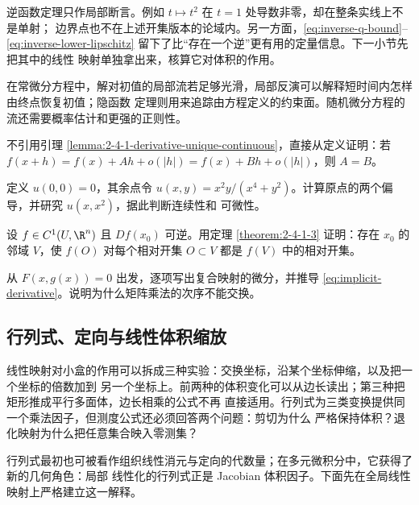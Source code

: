 逆函数定理只作局部断言。例如 $t\mapsto t^2$ 在 $t=1$ 处导数非零，却在整条实线上不是单射；
边界点也不在上述开集版本的论域内。另一方面，\eqref{eq:inverse-q-bound}--
\eqref{eq:inverse-lower-lipschitz} 留下了比“存在一个逆”更有用的定量信息。下一小节先把其中的线性
映射单独拿出来，核算它对体积的作用。

在常微分方程中，解对初值的局部流若足够光滑，局部反演可以解释短时间内怎样由终点恢复初值；隐函数
定理则用来追踪由方程定义的约束面。随机微分方程的流还需要概率估计和更强的正则性。

\begin{exercise}[微分的唯一性]\label{exercise:2-4-1-1}
不引用引理 \ref{lemma:2-4-1-derivative-unique-continuous}，直接从定义证明：若
$f(x+h)=f(x)+Ah+o(|h|)=f(x)+Bh+o(|h|)$，则 $A=B$。
\end{exercise}

\begin{exercise}[偏导仍然不够]\label{exercise:2-4-1-2}
定义 $u(0,0)=0$，其余点令 $u(x,y)=x^2y/(x^4+y^2)$。计算原点的两个偏导，并研究
$u(x,x^2)$，据此判断连续性和 \Frechet{} 可微性。
\end{exercise}

\begin{exercise}[局部开映射]\label{exercise:2-4-1-3}
设 $f\in C^1(U,\R^n)$ 且 $Df(x_0)$ 可逆。用定理 \ref{theorem:2-4-1-3} 证明：存在
$x_0$ 的邻域 $V$，使 $f(O)$ 对每个相对开集 $O\subset V$ 都是 $f(V)$ 中的相对开集。
\end{exercise}

\begin{exercise}[隐函数导数]\label{exercise:2-4-1-4}
从 $F(x,g(x))=0$ 出发，逐项写出复合映射的微分，并推导
\eqref{eq:implicit-derivative}。说明为什么矩阵乘法的次序不能交换。
\end{exercise}

\subsection{行列式、定向与线性体积缩放}\label{subsec:2-4-2}

线性映射对小盒的作用可以拆成三种实验：交换坐标，沿某个坐标伸缩，以及把一个坐标的倍数加到
另一个坐标上。前两种的体积变化可以从边长读出；第三种把矩形推成平行多面体，边长相乘的公式不再
直接适用。行列式为三类变换提供同一个乘法因子，但测度公式还必须回答两个问题：剪切为什么
严格保持体积？退化映射为什么把任意集合映入零测集？

行列式最初也可被看作组织线性消元与定向的代数量；在多元微积分中，它获得了新的几何角色：局部
线性化的行列式正是 Jacobian 体积因子。下面先在全局线性映射上严格建立这一解释。

